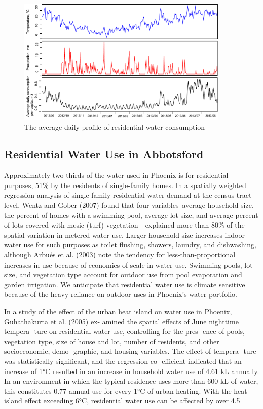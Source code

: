 \documentclass[a4paper,12pt]{llncs}
\begin{document}
\begin{figure}[htp]
\centering
\includegraphics[width=0.9\textwidth]{images/weathervariableinwaterdemand}
\caption{The average daily profile of residential water consumption}
\label{fig:dailyprofile}
\end{figure}

\subsection{Residential Water Use in Abbotsford}
Approximately two-thirds of the water used in Phoenix is for residential purposes, 51\% by the residents of single-family homes. In a spatially weighted regression analysis of single-family residential water demand at the census tract level, Wentz and Gober (2007) found that four variables--average household size, the percent of homes with a swimming pool, average lot size, and average percent of lots covered with mesic (turf) vegetation—explained more than 80\% of the spatial variation in metered water use. Larger household size increases indoor water use for such purposes as toilet flushing, showers, laundry, and dishwashing, although Arbu\'{e}s et al. (2003) note the tendency for less-than-proportional increases in use because of economies of
scale in water use. Swimming pools, lot size, and vegetation type account for outdoor use from pool evaporation and garden irrigation. We anticipate that residential water use is climate sensitive because of the
heavy reliance on outdoor uses in Phoenix’s water portfolio.

In a study of the effect of the urban heat island on
water use in Phoenix, Guhathakurta et al. (2005) ex-
amined the spatial effects of June nighttime tempera-
ture on residential water use, controlling for the pres-
ence of pools, vegetation type, size of house and lot,
number of residents, and other socioeconomic, demo-
graphic, and housing variables. The effect of tempera-
ture was statistically significant, and the regression co-
efficient indicated that an increase of 1°C resulted in an
increase in household water use of 4.61 kL annually. In
an environment in which the typical residence uses
more than 600 kL of water, this constitutes 0.77%
annual use for every 1°C of urban heating. With the
heat-island effect exceeding 6°C, residential water use
can be affected by over 4.5%
\end{document}
